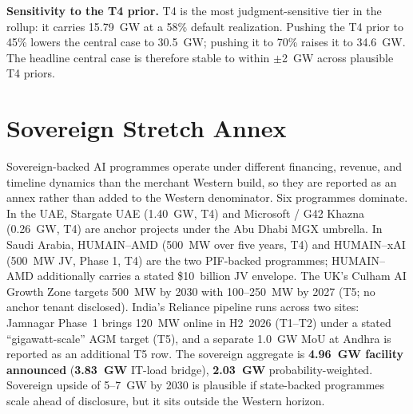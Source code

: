 \documentclass[11pt,a4paper]{article}
\begin{document}
\textbf{Sensitivity to the T4 prior.} T4 is the most judgment-sensitive tier in the rollup: it carries 15.79~GW at a 58\% default realization. Pushing the T4 prior to 45\% lowers the central case to 30.5~GW; pushing it to 70\% raises it to 34.6~GW. The headline central case is therefore stable to within $\pm$2~GW across plausible T4 priors.

\section{Sovereign Stretch Annex}

Sovereign-backed AI programmes operate under different financing, revenue, and timeline dynamics than the merchant Western build, so they are reported as an annex rather than added to the Western denominator. Six programmes dominate. In the UAE, Stargate UAE (1.40~GW, T4) and Microsoft / G42 Khazna (0.26~GW, T4) are anchor projects under the Abu Dhabi MGX umbrella. In Saudi Arabia, HUMAIN--AMD (500~MW over five years, T4) and HUMAIN--xAI (500~MW JV, Phase 1, T4) are the two PIF-backed programmes; HUMAIN--AMD additionally carries a stated \$10~billion JV envelope. The UK's Culham AI Growth Zone targets 500~MW by 2030 with 100--250~MW by 2027 (T5; no anchor tenant disclosed). India's Reliance pipeline runs across two sites: Jamnagar Phase~1 brings 120~MW online in H2~2026 (T1--T2) under a stated ``gigawatt-scale'' AGM target (T5), and a separate 1.0~GW MoU at Andhra is reported as an additional T5 row. The sovereign aggregate is \textbf{4.96~GW facility announced} (\textbf{3.83~GW} IT-load bridge), \textbf{2.03~GW} probability-weighted. Sovereign upside of 5--7~GW by 2030 is plausible if state-backed programmes scale ahead of disclosure, but it sits outside the Western horizon.
\end{document}
